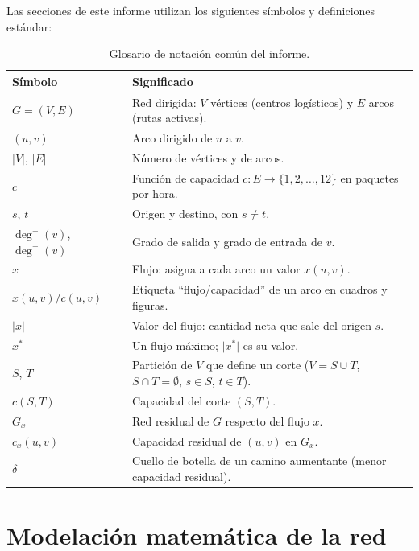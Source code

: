 \documentclass[12pt, a4paper]{article}
\begin{document}
Las secciones de este informe utilizan los siguientes símbolos y definiciones estándar:

\begin{table}[H]
  \centering
  \begin{tabular}{lp{10.5cm}}
    \toprule
    \textbf{Símbolo} & \textbf{Significado} \\
    \midrule
    $G = (V, E)$ & Red dirigida: $V$ vértices (centros logísticos) y $E$ arcos (rutas activas). \\
    $(u,v)$ & Arco dirigido de $u$ a $v$. \\
    $\lvert V\rvert$, $\lvert E\rvert$ & Número de vértices y de arcos. \\
    $c$ & Función de capacidad $c: E \to \{1, 2, \dots, 12\}$ en paquetes por hora. \\
    $s$, $t$ & Origen y destino, con $s \ne t$. \\
    $\deg^+(v)$, $\deg^-(v)$ & Grado de salida y grado de entrada de $v$. \\
    $x$ & Flujo: asigna a cada arco un valor $x(u,v)$. \\
    $x(u,v)/c(u,v)$ & Etiqueta ``flujo/capacidad'' de un arco en cuadros y figuras. \\
    $\lvert x\rvert$ & Valor del flujo: cantidad neta que sale del origen $s$. \\
    $x^*$ & Un flujo máximo; $\lvert x^*\rvert$ es su valor. \\
    $S$, $T$ & Partición de $V$ que define un corte ($V = S \cup T$, $S \cap T = \emptyset$, $s \in S$, $t \in T$). \\
    $c(S,T)$ & Capacidad del corte $(S,T)$. \\
    $G_x$ & Red residual de $G$ respecto del flujo $x$. \\
    $c_x(u,v)$ & Capacidad residual de $(u,v)$ en $G_x$. \\
    $\delta$ & Cuello de botella de un camino aumentante (menor capacidad residual). \\
    \bottomrule
  \end{tabular}
  \caption{Glosario de notación común del informe.}
  \label{tab:notacion}
\end{table}

\section{Modelación matemática de la red}
\end{document}
